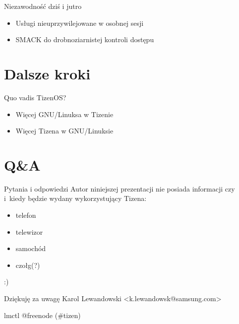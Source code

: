 \documentclass[presentation,aspectratio=43,12pt]{beamer}
\begin{document}
\begin{frame}[label=sec-5-3]{Niezawodność dziś i jutro}
\begin{itemize}
\item Usługi nieuprzywilejowane w osobnej sesji

\item SMACK do drobnoziarnistej kontroli dostępu
\end{itemize}
\end{frame}
\section{Dalsze kroki}
\label{sec-6}

\begin{frame}[label=sec-6-1]{Quo vadis TizenOS?}
\begin{itemize}
\item Więcej GNU/Linuksa w Tizenie
\item <2-> Więcej Tizena w GNU/Linuksie
\end{itemize}
\end{frame}

\section{Q\&A}
\label{sec-7}

\begin{frame}[label=sec-7-1]{Pytania i odpowiedzi}
Autor niniejszej prezentacji nie posiada informacji czy i~kiedy będzie
wydany wykorzystujący Tizena:

\begin{itemize}
\item telefon
\item telewizor
\item samochód
\item czołg(?)
\end{itemize}

:)
\end{frame}

\begin{frame}[label=sec-7-2]{Dziękuję za uwagę}
Karol Lewandowski <k.lewandowsk@samsung.com>

lmctl @freenode (\#tizen)
\end{frame}
\end{document}
